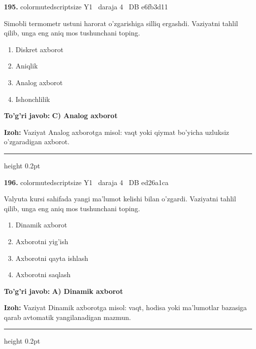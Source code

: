 \documentclass[10pt,a4paper,oneside]{article}
\begin{document}
\noindent\textbf{\color{ink}195.}  {color{muted}scriptsize Y1 \textbullet\ daraja 4 \textbullet\ DB e6fb3d11}
\par
Simobli termometr ustuni harorat o'zgarishiga silliq ergashdi. Vaziyatni tahlil qilib, unga eng aniq mos tushunchani toping.
\begin{enumerate}[label=\Alph*),leftmargin=9mm]
\item Diskret axborot
\item Aniqlik
\item Analog axborot
\item Ishonchlilik
\end{enumerate}
\begin{tcolorbox}[enhanced,breakable,colback=teal!4,colframe=teal!50!black,boxrule=0.5pt,arc=1.1mm,left=3mm,right=3mm,top=1.7mm,bottom=1.7mm,before skip=2mm,after skip=2mm]
\textbf{\color{teal}To'g'ri javob:} \textbf{C) Analog axborot}
\par\smallskip
\textbf{Izoh:} Vaziyat Analog axborotga misol: vaqt yoki qiymat bo'yicha uzluksiz o'zgaradigan axborot.
\end{tcolorbox}
\vspace{2mm}\hrule height 0.2pt \vspace{3mm}

\noindent\textbf{\color{ink}196.}  {color{muted}scriptsize Y1 \textbullet\ daraja 4 \textbullet\ DB ed26a1ca}
\par
Valyuta kursi sahifada yangi ma'lumot kelishi bilan o'zgardi. Vaziyatni tahlil qilib, unga eng aniq mos tushunchani toping.
\begin{enumerate}[label=\Alph*),leftmargin=9mm]
\item Dinamik axborot
\item Axborotni yig'ish
\item Axborotni qayta ishlash
\item Axborotni saqlash
\end{enumerate}
\begin{tcolorbox}[enhanced,breakable,colback=teal!4,colframe=teal!50!black,boxrule=0.5pt,arc=1.1mm,left=3mm,right=3mm,top=1.7mm,bottom=1.7mm,before skip=2mm,after skip=2mm]
\textbf{\color{teal}To'g'ri javob:} \textbf{A) Dinamik axborot}
\par\smallskip
\textbf{Izoh:} Vaziyat Dinamik axborotga misol: vaqt, hodisa yoki ma'lumotlar bazasiga qarab avtomatik yangilanadigan mazmun.
\end{tcolorbox}
\vspace{2mm}\hrule height 0.2pt \vspace{3mm}
\end{document}
